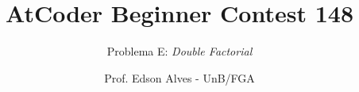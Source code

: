 \title{AtCoder Beginner Contest 148}
\subtitle{Problema E: {\it Double Factorial}}
\author{Prof. Edson Alves - UnB/FGA}
\date{}
